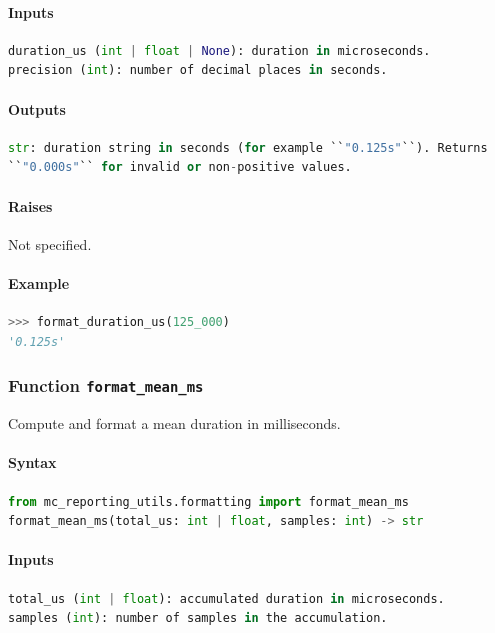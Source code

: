 \documentclass[11pt]{article}
\begin{document}
\paragraph{Inputs}
\begin{lstlisting}[language=Python]
duration_us (int | float | None): duration in microseconds.
precision (int): number of decimal places in seconds.
\end{lstlisting}
\paragraph{Outputs}
\begin{lstlisting}[language=Python]
str: duration string in seconds (for example ``"0.125s"``). Returns
``"0.000s"`` for invalid or non-positive values.
\end{lstlisting}
\paragraph{Raises}
Not specified.
\paragraph{Example}
\begin{lstlisting}[language=Python]
>>> format_duration_us(125_000)
'0.125s'
\end{lstlisting}

\subsubsection{Function \texttt{format\_mean\_ms}}
Compute and format a mean duration in milliseconds.

\paragraph{Syntax}
\begin{lstlisting}[language=Python]
from mc_reporting_utils.formatting import format_mean_ms
format_mean_ms(total_us: int | float, samples: int) -> str
\end{lstlisting}
\paragraph{Inputs}
\begin{lstlisting}[language=Python]
total_us (int | float): accumulated duration in microseconds.
samples (int): number of samples in the accumulation.
\end{lstlisting}
\end{document}
